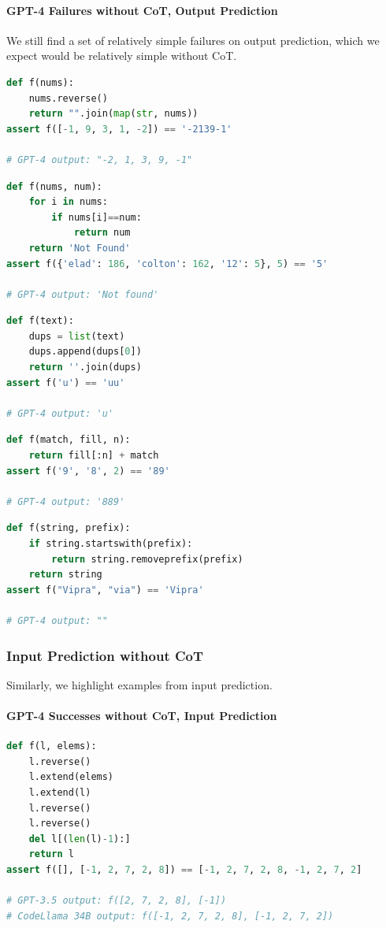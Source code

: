 \paragraph{GPT-4 Failures without CoT, Output Prediction}
We still find a set of relatively simple failures on output prediction, which we expect would be relatively simple without CoT.

\begin{lstlisting}[language=python]
def f(nums):
    nums.reverse()
    return "".join(map(str, nums))
assert f([-1, 9, 3, 1, -2]) == '-2139-1'

# GPT-4 output: "-2, 1, 3, 9, -1"
\end{lstlisting}

\begin{lstlisting}[language=python]
def f(nums, num):
    for i in nums:
        if nums[i]==num:
            return num
    return 'Not Found'
assert f({'elad': 186, 'colton': 162, '12': 5}, 5) == '5'

# GPT-4 output: 'Not found'
\end{lstlisting}

\begin{lstlisting}[language=python]
def f(text):
    dups = list(text)
    dups.append(dups[0])
    return ''.join(dups)
assert f('u') == 'uu'

# GPT-4 output: 'u'
\end{lstlisting}

\begin{lstlisting}[language=python]
def f(match, fill, n):
    return fill[:n] + match
assert f('9', '8', 2) == '89'

# GPT-4 output: '889'
\end{lstlisting}

\begin{lstlisting}[language=python]
def f(string, prefix):
    if string.startswith(prefix):
        return string.removeprefix(prefix)
    return string
assert f("Vipra", "via") == 'Vipra'

# GPT-4 output: ""
\end{lstlisting}


\subsubsection{Input Prediction without CoT}
Similarly, we highlight examples from input prediction.
\paragraph{GPT-4 Successes without CoT, Input Prediction}
\begin{lstlisting}[language=python]
def f(l, elems):
    l.reverse()
    l.extend(elems)
    l.extend(l)
    l.reverse()
    l.reverse()
    del l[(len(l)-1):]
    return l
assert f([], [-1, 2, 7, 2, 8]) == [-1, 2, 7, 2, 8, -1, 2, 7, 2]

# GPT-3.5 output: f([2, 7, 2, 8], [-1])
# CodeLlama 34B output: f([-1, 2, 7, 2, 8], [-1, 2, 7, 2])
\end{lstlisting}

